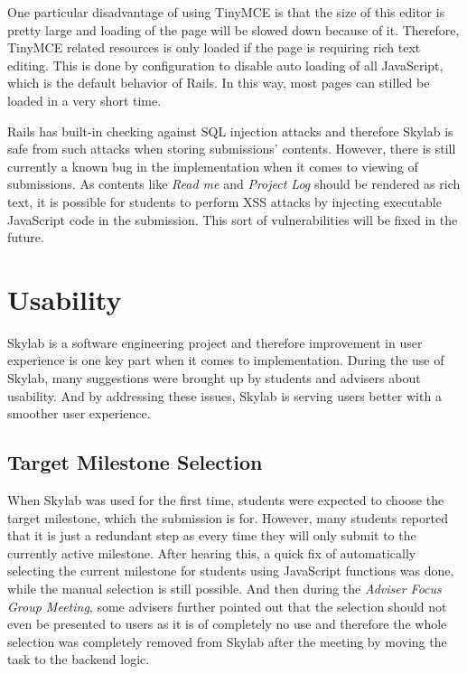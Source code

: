 One particular disadvantage of using TinyMCE is that the size of this editor is pretty large and loading of the page will be slowed down because of it. Therefore, TinyMCE related resources is only loaded if the page is requiring rich text editing. This is done by configuration to disable auto loading of all JavaScript, which is the default behavior of Rails. In this way, most pages can stilled be loaded in a very short time.

Rails has built-in checking against SQL injection attacks and therefore Skylab is safe from such attacks when storing submissions' contents\cite{citation11}. However, there is still currently a known bug in the implementation when it comes to viewing of submissions. As contents like \textit{Read me} and \textit{Project Log} should be rendered as rich text, it is possible for students to perform XSS attacks by injecting executable JavaScript code in the submission. This sort of vulnerabilities will be fixed in the future.

\section{Usability}

Skylab is a software engineering project and therefore improvement in user experience is one key part when it comes to implementation. During the use of Skylab, many suggestions were brought up by students and advisers about usability. And by addressing these issues, Skylab is serving users better with a smoother user experience.

\subsection{Target Milestone Selection}

When Skylab was used for the first time, students were expected to choose the target milestone, which the submission is for. However, many students reported that it is just a redundant step as every time they will only submit to the currently active milestone. After hearing this, a quick fix of automatically selecting the current milestone for students using JavaScript functions was done, while the manual selection is still possible. And then during the \textit{Adviser Focus Group Meeting}, some advisers further pointed out that the selection should not even be presented to users as it is of completely no use and therefore the whole selection was completely removed from Skylab after the meeting by moving the task to the backend logic. 

